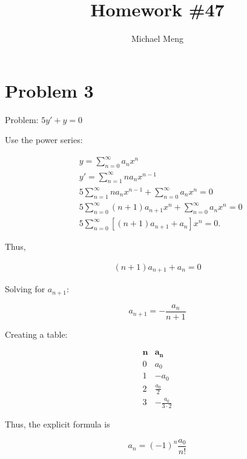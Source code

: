 \documentclass[11pt]{article}
\title{Homework \#47}
\author{Michael Meng}
\begin{document}
\maketitle

\section*{Problem 3}

Problem: \( 5y' + y = 0 \)

Use the power series:

\begin{equation*}
    \begin{aligned}
        & y = \sum_{n = 0}^{\infty} a_{n}x^{n} \\
        & y' = \sum_{n = 1}^{\infty} na_{n}x^{n-1} \\
        & 5 \sum_{n = 1}^{\infty} na_{n}x^{n-1}
        + \sum_{n = 0}^{\infty} a_{n}x^{n} = 0 \\
        & 5 \sum_{n = 0}^{\infty} (n + 1)a_{n+1}x^{n}
        + \sum_{n = 0}^{\infty} a_{n}x^{n} = 0 \\
        & 5 \sum_{n = 0}^{\infty} [(n + 1)a_{n+1} 
        + a_{n}] x^{n} = 0.
    \end{aligned}
\end{equation*}

Thus,

\begin{equation*}
    \begin{aligned}
        (n + 1) a_{n+1} + a_{n} = 0
    \end{aligned}
\end{equation*}

Solving for \( a_{n+1} \):

\[
a_{n+1} = -\frac{a_{n}}{n+1}
\]

Creating a table:

\[
\begin{array}{c|c}
    \mathbf{n} & \mathbf{a_{n}} \\
    \hline
    0 & a_{0} \\
    [2px] \hline
    1 & -a_{0} \\
    [2px] \hline
    2 & \frac{a_{0}}{2} \\
    [2px] \hline
    3 & -\frac{a_{0}}{3 \cdot 2}
\end{array}
\]

Thus, the explicit formula is

\[
a_{n} = (-1)^{n} \frac{a_{0}}{n!}
\]
\end{document}
